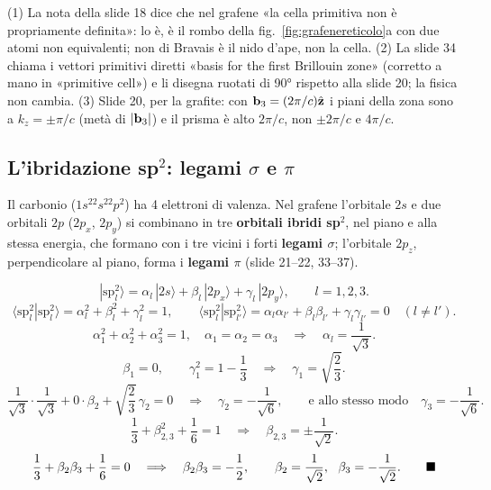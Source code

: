 \documentclass[11pt,a4paper]{article}
\begin{document}
\begin{osservazione}[slide 18, 20 e 34]
(1) La nota della slide 18 dice che nel grafene «la cella primitiva non è propriamente definita»: lo è, è il rombo della fig.~\ref{fig:grafenereticolo}a
con due atomi non equivalenti; non di Bravais è il nido d'ape, non la cella. (2) La slide 34 chiama i vettori primitivi diretti «basis for the first
Brillouin zone» (corretto a mano in «primitive cell») e li disegna ruotati di \ang{90} rispetto alla slide 20; la fisica non cambia. (3) Slide 20, per la
grafite: con $\mathbf b_3=(2\pi/c)\hat{\mathbf z}$ i piani della zona sono a $k_z=\pm\pi/c$ (metà di $|\mathbf b_3|$) e il prisma è alto $2\pi/c$, non $\pm2\pi/c$ e $4\pi/c$.
\end{osservazione}

\subsection{L'ibridazione sp$^2$: legami $\sigma$ e $\pi$}\label{sec:ibridi}
Il carbonio ($1s^22s^22p^2$) ha 4 elettroni di valenza. Nel grafene l'orbitale $2s$ e due orbitali $2p$ ($2p_x$, $2p_y$) si combinano in tre
\textbf{orbitali ibridi sp$^2$}, nel piano e alla stessa energia, che formano con i tre vicini i forti \textbf{legami $\sigma$}; l'orbitale $2p_z$,
perpendicolare al piano, forma i \textbf{legami $\pi$} (slide 21--22, 33--37).

\begin{dimostrazione}
\[ |\mathrm{sp}^2_l\rangle=\alpha_l\,|2s\rangle+\beta_l\,|2p_x\rangle+\gamma_l\,|2p_y\rangle,\qquad l=1,2,3. \]
\[ \langle\mathrm{sp}^2_l|\mathrm{sp}^2_l\rangle=\alpha_l^2+\beta_l^2+\gamma_l^2=1,\qquad
   \langle\mathrm{sp}^2_l|\mathrm{sp}^2_{l'}\rangle=\alpha_l\alpha_{l'}+\beta_l\beta_{l'}+\gamma_l\gamma_{l'}=0\quad(l\ne l'). \]
\[ \alpha_1^2+\alpha_2^2+\alpha_3^2=1,\quad \alpha_1=\alpha_2=\alpha_3\quad\Longrightarrow\quad \alpha_l=\frac1{\sqrt3}. \]
\[ \beta_1=0,\qquad \gamma_1^2=1-\frac13\quad\Longrightarrow\quad\gamma_1=\sqrt{\frac23}. \]
\[ \frac1{\sqrt3}\cdot\frac1{\sqrt3}+0\cdot\beta_2+\sqrt{\frac23}\,\gamma_2=0\quad\Longrightarrow\quad\gamma_2=-\frac1{\sqrt6},\qquad
   \text{e allo stesso modo}\quad\gamma_3=-\frac1{\sqrt6}. \]
\[ \frac13+\beta_{2,3}^2+\frac16=1\quad\Longrightarrow\quad\beta_{2,3}=\pm\frac1{\sqrt2}. \]
\[ \frac13+\beta_2\beta_3+\frac16=0\quad\Longrightarrow\quad\beta_2\beta_3=-\frac12,\qquad \beta_2=\frac1{\sqrt2},\ \ \beta_3=-\frac1{\sqrt2}.\qed \]
\end{dimostrazione}
\end{document}
